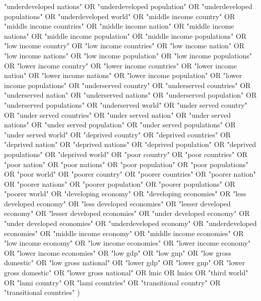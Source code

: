 \documentclass[12pt]{article}
\begin{document}
"underdeveloped nations" OR "underdeveloped population" OR "underdeveloped populations" OR "underdeveloped world" OR "middle income country" OR "middle income countries" OR "middle income nation" OR "middle income nations" OR "middle income population" OR "middle income populations" OR "low income country" OR "low income countries" OR "low income nation" OR "low income nations" OR "low income population" OR "low income populations" OR "lower income country" OR "lower income countries" OR "lower income nation" OR "lower income nations" OR "lower income population" OR "lower income populations" OR "underserved country" OR "underserved countries" OR "underserved nation" OR "underserved nations" OR "underserved population" OR "underserved populations" OR "underserved world" OR "under served country" OR "under served countries" OR "under served nation" OR "under served nations" OR "under served population" OR "under served populations" OR "under served world" OR "deprived country" OR "deprived countries" OR "deprived nation" OR "deprived nations" OR "deprived population" OR "deprived populations" OR "deprived world" OR "poor country" OR "poor countries" OR "poor nation" OR "poor nations" OR "poor population" OR "poor populations" OR "poor world" OR "poorer country" OR "poorer countries" OR "poorer nation" OR "poorer nations" OR "poorer population" OR "poorer populations" OR "poorer world" OR "developing economy" OR "developing economies" OR "less developed economy" OR "less developed economies" OR "lesser developed economy" OR "lesser developed economies" OR "under developed economy" OR "under developed economies" OR "underdeveloped economy" OR "underdeveloped economies" OR "middle income economy" OR "middle income economies" OR "low income economy" OR "low income economies" OR "lower income economy" OR "lower income economies" OR "low gdp" OR "low gnp" OR "low gross domestic" OR "low gross national" OR "lower gdp" OR "lower gnp" OR "lower gross domestic" OR "lower gross national" OR lmic OR lmics OR "third world" OR "lami country" OR "lami countries" OR "transitional country" OR "transitional countries" )
\end{document}
